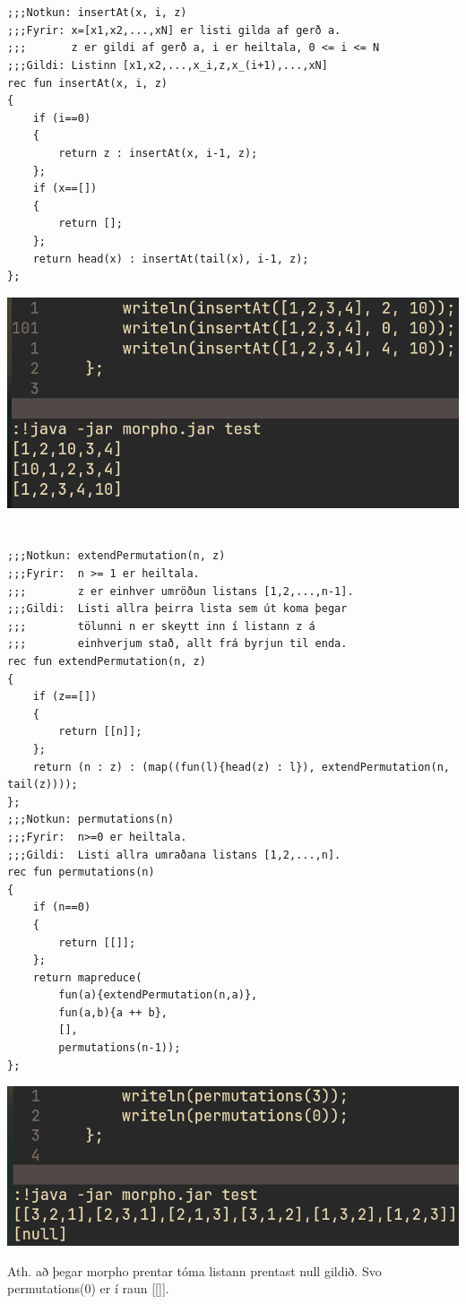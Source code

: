 \documentclass{article}
\begin{document}
	\newpage
	\section{}
	\begin{verbatim}
;;;Notkun: insertAt(x, i, z)
;;;Fyrir: x=[x1,x2,...,xN] er listi gilda af gerð a.
;;;       z er gildi af gerð a, i er heiltala, 0 <= i <= N
;;;Gildi: Listinn [x1,x2,...,x_i,z,x_(i+1),...,xN]
rec fun insertAt(x, i, z)
{
    if (i==0)
    {
        return z : insertAt(x, i-1, z);
    };
    if (x==[])
    {
        return [];
    };
    return head(x) : insertAt(tail(x), i-1, z);
};
	\end{verbatim}
	\begin{center}
		\includegraphics[scale=0.35]{insertat.png}
	\end{center}

	\newpage
	\section{}
	\begin{verbatim}
;;;Notkun: extendPermutation(n, z)
;;;Fyrir:  n >= 1 er heiltala.
;;;        z er einhver umröðun listans [1,2,...,n-1].
;;;Gildi:  Listi allra þeirra lista sem út koma þegar
;;;        tölunni n er skeytt inn í listann z á
;;;        einhverjum stað, allt frá byrjun til enda.
rec fun extendPermutation(n, z)
{
    if (z==[])
    {
        return [[n]];
    };
    return (n : z) : (map((fun(l){head(z) : l}), extendPermutation(n, tail(z))));
};
;;;Notkun: permutations(n)
;;;Fyrir:  n>=0 er heiltala.
;;;Gildi:  Listi allra umraðana listans [1,2,...,n].
rec fun permutations(n)
{
    if (n==0)
    {
        return [[]];
    };
    return mapreduce(
        fun(a){extendPermutation(n,a)},
        fun(a,b){a ++ b},
        [],
        permutations(n-1));
};
	\end{verbatim}
	\begin{center}
		\includegraphics[scale=0.35]{permutations.png}
	\end{center}
	Ath. að þegar morpho prentar tóma listann prentast null gildið. Svo 
	permutations(0) er í raun [[]].
\end{document}
